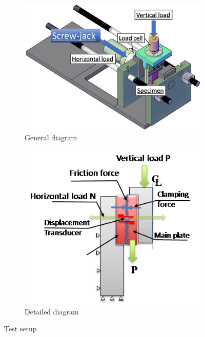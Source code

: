 \begin{figure}[htbp]
    \centering
    \begin{subfigure}[t]{0.58\textwidth}
    \includegraphics[width=\linewidth]{imgs/ch3/fig6a.png}
    \caption{General diagram}
    \label{ch3fig6a}  
    \end{subfigure}
    \hfill
    \begin{subfigure}[t]{0.38\textwidth}
    \includegraphics[width=\linewidth]{imgs/ch3/fig6b.png}
    \caption{Detailed diagram}
    \label{ch3fig6b}  
    \end{subfigure}
    \caption{Test setup}
    \label{ch3fig6}
\end{figure}

